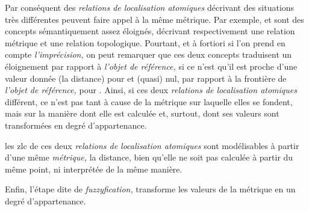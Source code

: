 Par conséquent des \emph{relations de localisation atomiques} décrivant des situations très différentes peuvent faire appel à la même métrique.
%
Par exemple,  et  sont des concepts sémantiquement assez éloignés, décrivant respectivement une relation métrique et une relation topologique. Pourtant, et à fortiori si l'on prend en compte \emph{l’imprécision,} on peut remarquer que ces deux concepts traduisent un éloignement par rapport à \emph{l'objet de référence,} si ce n'est qu'il est proche d'une valeur donnée (\ie la distance) pour  et (quasi) nul, par rapport à la frontière de \emph{l'objet de référence,} pour .
%
Ainsi, si ces deux \emph{relations de localisation atomiques} différent, ce n'est pas tant à cause de la métrique sur laquelle elles se fondent, mais sur la manière dont elle est calculée et, surtout, dont ses valeurs sont transformées en degré d'appartenance.

les \ac{zlc} de ces deux \emph{relations de localisation atomiques} sont modélisables à partir d'une même \emph{métrique,} la distance, bien qu'elle ne soit pas calculée à partir du même point, ni interprétée de la même manière.

%
Enfin, l'étape dite de \emph{fuzzyfication,} transforme les valeurs de la métrique en un degré d'appartenance.

